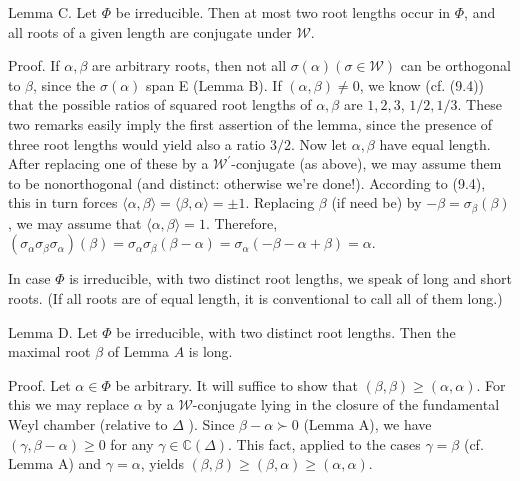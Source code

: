 \documentclass[10pt]{article}
\begin{document}
Lemma C. Let $\Phi$ be irreducible. Then at most two root lengths occur in $\Phi$, and all roots of a given length are conjugate under $\mathscr{W}$.

Proof. If $\alpha, \beta$ are arbitrary roots, then not all $\sigma(\alpha)(\sigma \in \mathscr{W})$ can be orthogonal to $\beta$, since the $\sigma(\alpha)$ span E (Lemma B). If $(\alpha, \beta) \neq 0$, we know (cf. (9.4)) that the possible ratios of squared root lengths of $\alpha, \beta$ are $1,2,3$, $1 / 2,1 / 3$. These two remarks easily imply the first assertion of the lemma, since the presence of three root lengths would yield also a ratio $3 / 2$. Now let $\alpha, \beta$ have equal length. After replacing one of these by a $\mathscr{W}^{\prime}$-conjugate (as above), we may assume them to be nonorthogonal (and distinct: otherwise we're done!). According to (9.4), this in turn forces $\langle\alpha, \beta\rangle=\langle\beta, \alpha\rangle= \pm 1$. Replacing $\beta$ (if need be) by $-\beta=\sigma_{\beta}(\beta)$, we may assume that $\langle\alpha, \beta\rangle=1$. Therefore, $\left(\sigma_{\alpha} \sigma_{\beta} \sigma_{\alpha}\right)(\beta)=\sigma_{\alpha} \sigma_{\beta}(\beta-\alpha)=\sigma_{\alpha}(-\beta-\alpha+\beta)=\alpha$.

In case $\Phi$ is irreducible, with two distinct root lengths, we speak of long and short roots. (If all roots are of equal length, it is conventional to call all of them long.)

Lemma D. Let $\Phi$ be irreducible, with two distinct root lengths. Then the maximal root $\beta$ of Lemma $A$ is long.

Proof. Let $\alpha \in \Phi$ be arbitrary. It will suffice to show that $(\beta, \beta) \geq(\alpha, \alpha)$. For this we may replace $\alpha$ by a $\mathscr{W}$-conjugate lying in the closure of the fundamental Weyl chamber (relative to $\Delta$ ). Since $\beta-\alpha \succ 0$ (Lemma A), we have $(\gamma, \beta-\alpha) \geq 0$ for any $\gamma \in \mathbb{C}(\Delta)$. This fact, applied to the cases $\gamma=\beta$ (cf. Lemma A) and $\gamma=\alpha$, yields $(\beta, \beta) \geq(\beta, \alpha) \geq(\alpha, \alpha)$.
\end{document}

